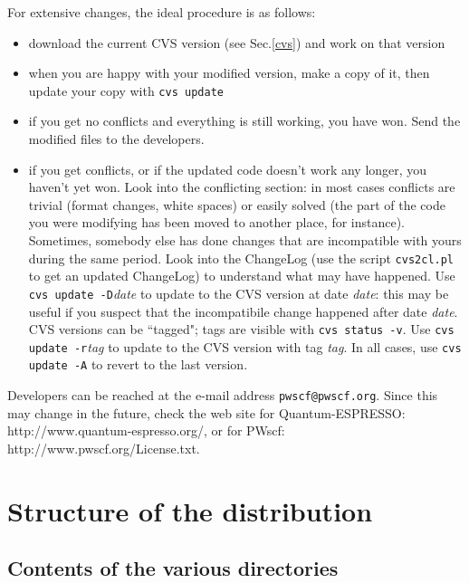 \documentclass[12pt,a4paper]{article}
\begin{document}
For extensive changes, the ideal procedure is as follows:
\begin{itemize}
   \item download the current CVS version (see Sec.\ref{cvs})
    and work on that version
   \item when you are happy with your modified version, make a copy of it,
    then update your copy with \texttt{cvs update}
  \item if you get no conflicts and everything is still working, you have
    won. Send the modified files to the developers.
  \item if you get conflicts, or if the updated code doesn't work any
    longer, you haven't yet won. Look into the conflicting section:
    in most cases conflicts are trivial (format changes, white spaces) 
    or easily solved (the part of the code you were modifying has
    been moved to another place, for instance). Sometimes, somebody
    else has done changes that are incompatible with yours during the
    same period. Look into the ChangeLog (use the script \texttt{cvs2cl.pl}
    to get an updated ChangeLog) to understand what may have happened.
    Use \texttt{cvs update -D}{\em date} to update to the CVS version 
    at date {\em date}:
    this may be useful if you suspect that the incompatibile change 
    happened after date {\em date}.
    CVS versions can be ``tagged"; tags are visible with 
    \texttt{cvs status -v}. Use \texttt{cvs update -r}{\em tag} 
    to update to the CVS version with tag {\em tag}.
    In all cases, use \texttt{cvs update -A} to revert to the last version.
\end{itemize}

Developers can be reached at the e-mail address \texttt{pwscf@pwscf.org}.
Since this may change in the future, check the web site for 
Quantum-ESPRESSO: 
%
{http://www.quantum-espresso.org/}, or for
PWscf: %
{http://www.pwscf.org/License.txt}.

\section{Structure of the distribution}

\subsection{Contents of the various directories}
\end{document}
